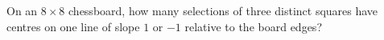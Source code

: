 On an $8\times8$ chessboard, how many selections of three distinct squares have centres on one line of slope $1$ or $-1$ relative to the board edges?
